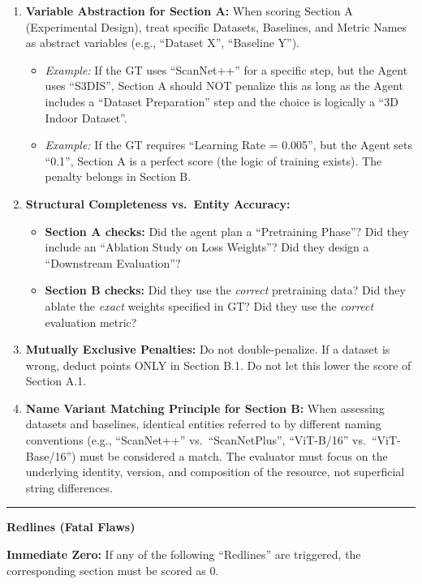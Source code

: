 \begin{tcolorbox}[
	title={Box 7: Full Evaluation Prompt},
	colback=blue!3!white,
	colframe=blue!30!black,
	colbacktitle=blue!15!white,
	coltitle=black,
	fonttitle=\bfseries,
	arc=3mm,
	boxrule=0.8pt,
	breakable
]
\begin{enumerate}[nosep,leftmargin=12pt]
	\item \textbf{Variable Abstraction for Section A:} When scoring Section A (Experimental Design), treat specific Datasets, Baselines, and Metric Names as abstract variables (e.g., ``Dataset X'', ``Baseline Y'').
	\begin{itemize}[nosep,leftmargin=16pt]
		\item \textit{Example:} If the GT uses ``ScanNet++'' for a specific step, but the Agent uses ``S3DIS'', Section A should NOT penalize this as long as the Agent includes a ``Dataset Preparation'' step and the choice is logically a ``3D Indoor Dataset''.
		\item \textit{Example:} If the GT requires ``Learning Rate = 0.005'', but the Agent sets ``0.1'', Section A is a perfect score (the logic of training exists). The penalty belongs in Section B.
	\end{itemize}
	\item \textbf{Structural Completeness vs.\ Entity Accuracy:}
	\begin{itemize}[nosep,leftmargin=16pt]
		\item \textbf{Section A checks:} Did the agent plan a ``Pretraining Phase''? Did they include an ``Ablation Study on Loss Weights''? Did they design a ``Downstream Evaluation''?
		\item \textbf{Section B checks:} Did they use the \textit{correct} pretraining data? Did they ablate the \textit{exact} weights specified in GT? Did they use the \textit{correct} evaluation metric?
	\end{itemize}
	\item \textbf{Mutually Exclusive Penalties:} Do not double-penalize. If a dataset is wrong, deduct points ONLY in Section B.1. Do not let this lower the score of Section A.1.
	\item \textbf{Name Variant Matching Principle for Section B:} When assessing datasets and baselines, identical entities referred to by different naming conventions (e.g., ``ScanNet++'' vs.\ ``ScanNetPlus'', ``ViT-B/16'' vs.\ ``ViT-Base/16'') must be considered a match. The evaluator must focus on the underlying identity, version, and composition of the resource, not superficial string differences.
\end{enumerate}

\medskip\hrule\medskip

\textbf{Redlines (Fatal Flaws)}

\textbf{Immediate Zero:} If any of the following ``Redlines'' are triggered, the corresponding section must be scored as 0.


\end{tcolorbox}
